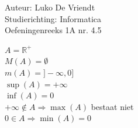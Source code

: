 \documentclass[a4paper]{article}
\begin{document}
\noindent \large Auteur: Luko De Vriendt\\
\noindent \large Studierichting: Informatica\\
\noindent \large Oefeningenreeks 1A nr. 4.5\\

\medskip

\normalsize

$A = \mathbb{R}^+$ \\


$M(A) = \emptyset$ \\

$m(A) = ]-\infty, 0]$ \\

$\sup(A) = +\infty$ \\

$\inf(A) = 0$ \\

$+\infty \notin A \Rightarrow \max(A)$ bestaat niet \\

$0 \in A \Rightarrow \min(A) = 0$ \\
	
\end{document}
